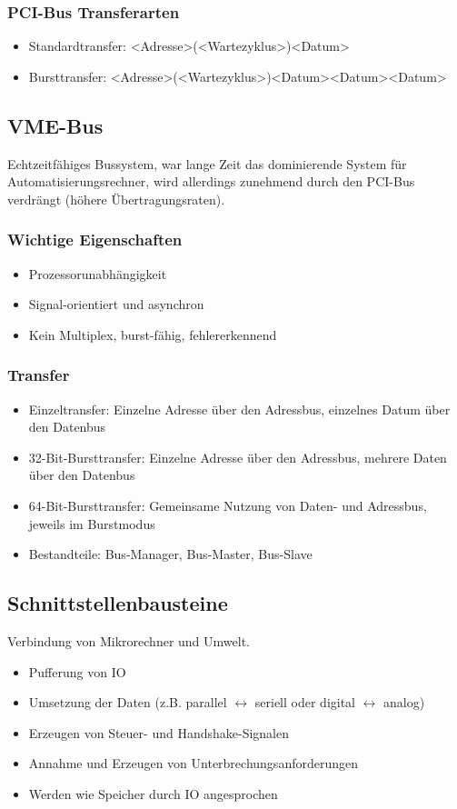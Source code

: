 \subsubsection{PCI-Bus Transferarten}
\begin{itemize}
	\item Standardtransfer: <Adresse>(<Wartezyklus>)<Datum>
	\item Bursttransfer: <Adresse>(<Wartezyklus>)<Datum><Datum><Datum>
\end{itemize}


\subsection{VME-Bus}

Echtzeitfähiges Bussystem, war lange Zeit das dominierende System für Automatisierungsrechner, wird allerdings zunehmend durch den PCI-Bus verdrängt (höhere Übertragungsraten).

\subsubsection{Wichtige Eigenschaften}
\begin{itemize}
	\item Prozessorunabhängigkeit
	\item Signal-orientiert und asynchron
	\item Kein Multiplex, burst-fähig, fehlererkennend
\end{itemize}

\subsubsection{Transfer}
\begin{itemize}
	\item Einzeltransfer: Einzelne Adresse über den Adressbus, einzelnes Datum über den Datenbus
	\item 32-Bit-Bursttransfer: Einzelne Adresse über den Adressbus, mehrere Daten über den Datenbus
	\item 64-Bit-Bursttransfer: Gemeinsame Nutzung von Daten- und Adressbus, jeweils im Burstmodus
	\item Bestandteile: Bus-Manager, Bus-Master, Bus-Slave
\end{itemize}


\subsection{Schnittstellenbausteine}
Verbindung von Mikrorechner und Umwelt.
\begin{itemize}
	\item Pufferung von IO
	\item Umsetzung der Daten (z.B. parallel $\leftrightarrow$ seriell oder digital $\leftrightarrow$ analog)
	\item Erzeugen von Steuer- und Handshake-Signalen
	\item Annahme und Erzeugen von Unterbrechungsanforderungen
	\item Werden wie Speicher durch IO angesprochen
\end{itemize}



